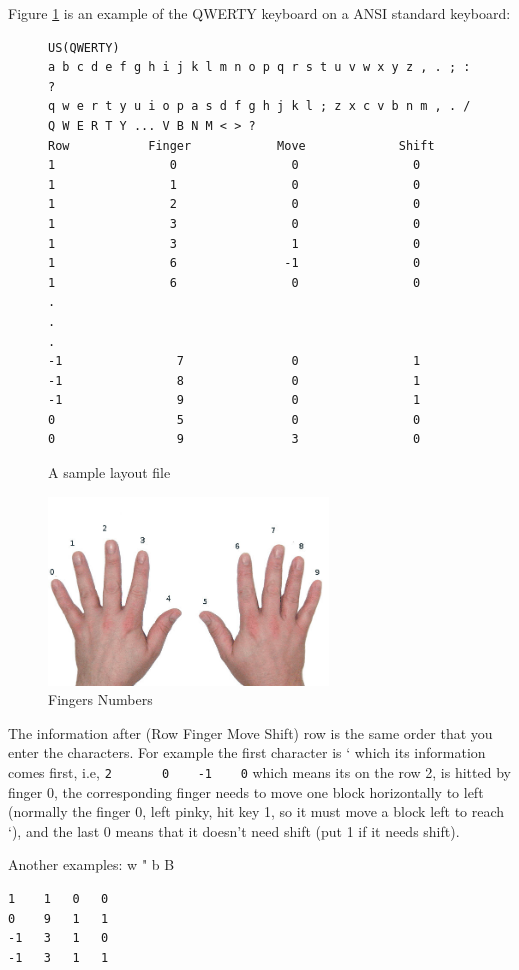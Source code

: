 \documentclass{amsart}
\begin{document}
Figure \ref{layoutfile} is an example of the QWERTY keyboard on a ANSI standard keyboard:
\begin{figure}[!ht]
\begin{verbatim}
US(QWERTY)
a b c d e f g h i j k l m n o p q r s t u v w x y z , . ; : ?
q w e r t y u i o p a s d f g h j k l ; z x c v b n m , . / Q W E R T Y ... V B N M < > ?
Row           Finger            Move             Shift
1                0                0                0
1                1                0                0
1                2                0                0 
1                3                0                0
1                3                1                0
1                6               -1                0
1                6                0                0
.
.
.
-1                7               0                1
-1                8               0                1
-1                9               0                1
0                 5               0                0
0                 9               3                0

\end{verbatim}
\caption{A sample layout file}\label{layoutfile}
\end{figure}
\begin{figure}[!ht]
\includegraphics[height=5cm]{fingers.jpg}
\caption{Fingers Numbers}\label{fingers}
\end{figure}
The information after (Row 	Finger 	Move Shift) row is the same order that you enter
the characters. For example the first character is ` which its information comes first, 
i.e, \verb+2	   0    -1    0+ which means its on the row 2, is hitted by finger 0,
the corresponding finger needs to move one block horizontally to left (normally the finger 0, 
left pinky, hit key 1, so it must move a block left to reach `), and the last 0 means that it doesn't need shift (put 1 if it needs shift).

Another examples: w " b B

\begin{verbatim}
1    1   0   0
0    9   1   1
-1   3   1   0
-1   3   1   1
\end{verbatim}
\end{document}

